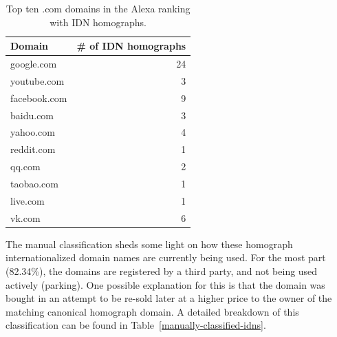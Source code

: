 \documentclass[letterpaper,twocolumn,10pt]{article}
\begin{document}
\begin{table}[ht!]
\centering
\begin{tabular}{lr}
\hline
Domain       & \# of IDN homographs \\ \hline
google.com   & 24                   \\
youtube.com  & 3                    \\
facebook.com & 9                    \\
baidu.com    & 3                    \\
yahoo.com    & 4                    \\
reddit.com   & 1                    \\
qq.com       & 2                    \\
taobao.com   & 1                    \\
live.com     & 1                    \\
vk.com       & 6                    \\ \hline
\end{tabular}
\caption{Top ten .com domains in the Alexa ranking with IDN homographs.}
\label{top-com-alexa-with-idns}
\end{table}

The manual classification sheds some light on how these homograph internationalized domain names are currently being used.
For the most part (82.34\%), the domains are registered by a third party, and not being used actively (parking).
One possible explanation for this is that the domain was bought in an attempt to be re-sold later at a higher price to the owner of the matching canonical homograph domain.
A detailed breakdown of this classification can be found in Table~\ref{manually-classified-idns}.
\end{document}
